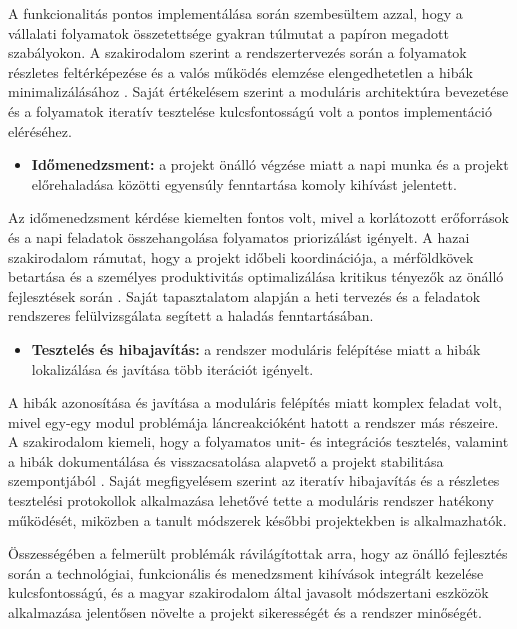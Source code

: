 A funkcionalitás pontos implementálása során szembesültem azzal, hogy a vállalati folyamatok összetettsége 
gyakran túlmutat a papíron megadott szabályokon. A szakirodalom szerint a rendszertervezés során a folyamatok 
részletes feltérképezése és a valós működés elemzése elengedhetetlen a hibák minimalizálásához \cite{Szalay2018,Hajdu2014}. 
Saját értékelésem szerint a moduláris architektúra bevezetése és a folyamatok iteratív tesztelése kulcsfontosságú volt a pontos implementáció eléréséhez.

\begin{itemize}
    \item \textbf{Időmenedzsment:} a projekt önálló végzése miatt a napi munka és a projekt előrehaladása 
    közötti egyensúly fenntartása komoly kihívást jelentett.
\end{itemize}

Az időmenedzsment kérdése kiemelten fontos volt, mivel a korlátozott erőforrások és a napi feladatok összehangolása 
folyamatos priorizálást igényelt. A hazai szakirodalom rámutat, hogy a projekt időbeli koordinációja, 
a mérföldkövek betartása és a személyes produktivitás optimalizálása kritikus tényezők az önálló fejlesztések során \cite{Kaposi2019,Kovacs2016}. 
Saját tapasztalatom alapján a heti tervezés és a feladatok rendszeres felülvizsgálata segített a haladás fenntartásában.

\begin{itemize}
    \item \textbf{Tesztelés és hibajavítás:} a rendszer moduláris felépítése miatt a hibák lokalizálása és javítása több iterációt igényelt.
\end{itemize}

A hibák azonosítása és javítása a moduláris felépítés miatt komplex feladat volt, mivel egy-egy modul problémája 
láncreakcióként hatott a rendszer más részeire. A szakirodalom kiemeli, hogy a folyamatos unit- és integrációs 
tesztelés, valamint a hibák dokumentálása és visszacsatolása alapvető a projekt stabilitása szempontjából \cite{Hajdu2014,Szalay2018}. 
Saját megfigyelésem szerint az iteratív hibajavítás és a részletes tesztelési protokollok alkalmazása lehetővé 
tette a moduláris rendszer hatékony működését, miközben a tanult módszerek későbbi projektekben is alkalmazhatók.

Összességében a felmerült problémák rávilágítottak arra, hogy az önálló fejlesztés során a technológiai, 
funkcionális és menedzsment kihívások integrált kezelése kulcsfontosságú, és a magyar szakirodalom által 
javasolt módszertani eszközök alkalmazása jelentősen növelte a projekt sikerességét és a rendszer minőségét.


